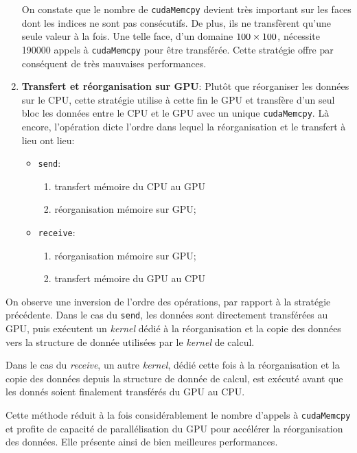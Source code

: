 \begin{enumerate}
On constate que le nombre de \texttt{cudaMemcpy} devient très important sur les faces dont les indices ne sont pas consécutifs. De plus, ils ne transfèrent qu'une seule valeur à la fois. Une telle face, d'un domaine $100\time100\times100$, nécessite 190000 appels à \texttt{cudaMemcpy} pour être transférée. 
Cette stratégie offre par conséquent de très mauvaises performances.

\item \textbf{Transfert et réorganisation sur \acs{GPU}}: Plutôt que réorganiser les données sur le \acs{CPU}, cette stratégie utilise à cette fin le \acs{GPU} et transfère d'un seul bloc les données entre le \acs{CPU} et le \acs{GPU} avec un unique \texttt{cudaMemcpy}. Là encore, l'opération dicte l'ordre dans lequel la réorganisation et le transfert à lieu ont lieu:
\begin{itemize}
	\item \texttt{send}:
	\begin{enumerate}
		\item transfert mémoire du \acs{CPU} au \acs{GPU}
		\item réorganisation mémoire sur \acs{GPU};
	\end{enumerate}
	\item \texttt{receive}:
	\begin{enumerate}
		\item réorganisation mémoire sur \acs{GPU};
		\item transfert mémoire du \acs{GPU} au \acs{CPU}
	\end{enumerate}
\end{itemize}
\end{enumerate}

On observe une inversion de l'ordre des opérations, par rapport à la stratégie précédente. Dans le cas du \texttt{send}, les données sont directement transférées au \acs{GPU}, puis exécutent un \textit{kernel} dédié à la réorganisation et la copie des données vers la structure de donnée utilisées par le \textit{kernel} de calcul.

Dans le cas du \textit{receive}, un autre \textit{kernel}, dédié cette fois à la réorganisation et la copie des données depuis la structure de donnée de calcul, est exécuté avant que les donnés soient finalement transférés du \acs{GPU} au \acs{CPU}.

Cette méthode réduit à la fois considérablement le nombre d'appels à \texttt{cudaMemcpy} et profite de capacité de parallélisation du \acs{GPU} pour accélérer la réorganisation des données. Elle présente ainsi de bien meilleures performances.

